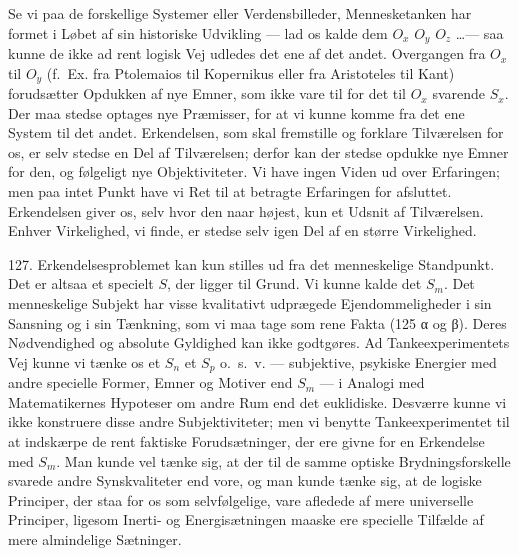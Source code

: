 \documentclass[12pt,a4paper]{book}
\newcommand{\apage}[1]{\marginnote{\footnotesize\textit{[#1]}}}
\begin{document}
\apage{303} Se vi paa de forskellige Systemer eller Verdensbilleder, Mennesketanken har formet i
Løbet af sin historiske Udvikling --- lad os kalde dem $O_x$ $O_y$ $O_z$ \ldots ---
saa kunne de ikke ad rent logisk Vej udledes det ene af det andet. Overgangen fra
$O_x$ til $O_y$ (f.\ Ex. fra Ptolemaios til Kopernikus eller fra Aristoteles til Kant)
forudsætter Opdukken af nye Emner, som ikke vare til for det til $O_x$ svarende $S_x$.
Der maa stedse optages nye Præmisser, for at vi kunne komme fra det ene System til det
andet. Erkendelsen, som skal fremstille og forklare Tilværelsen for os, er selv stedse
en Del af Tilværelsen; derfor kan der stedse opdukke nye Emner for den, og følgeligt nye
Objektiviteter. Vi have ingen Viden ud over Erfaringen; men paa intet Punkt have vi
Ret til at betragte Erfaringen for afsluttet. Erkendelsen giver os, selv hvor den naar
højest, kun et Udsnit af Tilværelsen. Enhver Virkelighed, vi finde, er stedse selv
igen Del af en større Virkelighed.

127. Erkendelsesproblemet kan kun stilles ud fra det menneskelige Standpunkt. Det er
altsaa et specielt $S$, der ligger til Grund. Vi kunne kalde det $S_m$. Det
menneskelige Subjekt har visse kvalitativt udprægede Ejendommeligheder i sin Sansning
og i sin Tænkning, som vi maa tage som rene Fakta (125 α og β). Deres Nødvendighed og
absolute Gyldighed kan ikke godtgøres. Ad Tankeexperimentets Vej kunne vi tænke os et $S_n$ et $S_p$ o.\ s.\ v. --- subjektive, psykiske Energier med andre specielle
Former, Emner og Motiver end $S_m$ --- i Analogi med Matematikernes Hypoteser om andre
Rum end det euklidiske. Desværre kunne vi ikke konstruere disse andre Subjektiviteter; men vi benytte Tankeexperimentet til at indskærpe de rent faktiske Forudsætninger, der
ere givne for en Erkendelse med $S_m$. Man kunde vel tænke sig, at der til de samme optiske Brydningsforskelle svarede andre Synskvaliteter end vore, og man kunde tænke
sig, at de logiske Principer, der staa for os som selvfølgelige, vare afledede af mere
universelle Principer, ligesom Inerti- og Energisætningen maaske ere specielle
Tilfælde af mere almindelige Sætninger.
\end{document}
